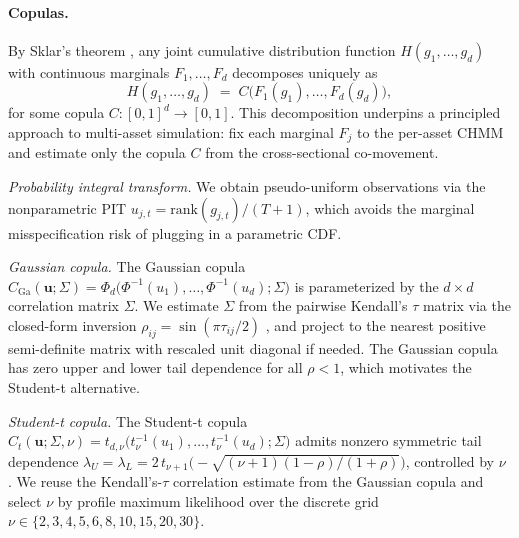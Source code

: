 \paragraph{Copulas.}
By Sklar's theorem \cite{sklar1959fonctions}, any joint cumulative distribution function $H(g_1, \dots, g_d)$ with continuous marginals $F_1, \dots, F_d$ decomposes uniquely as
\begin{equation}
    H(g_1, \dots, g_d) \;=\; C\bigl(F_1(g_1), \dots, F_d(g_d)\bigr),
    \label{eq:sklar}
\end{equation}
for some copula $C : [0,1]^d \to [0,1]$.
This decomposition underpins a principled approach to multi-asset simulation: fix each marginal $F_j$ to the per-asset CHMM and estimate only the copula $C$ from the cross-sectional co-movement.

\textit{Probability integral transform.}
We obtain pseudo-uniform observations via the nonparametric PIT $u_{j,t} = \text{rank}(g_{j,t}) / (T+1)$, which avoids the marginal misspecification risk of plugging in a parametric CDF.

\textit{Gaussian copula.}
The Gaussian copula $C_{\text{Ga}}(\mathbf{u}; \Sigma) = \Phi_d\bigl(\Phi^{-1}(u_1), \dots, \Phi^{-1}(u_d); \Sigma\bigr)$ is parameterized by the $d \times d$ correlation matrix $\Sigma$.
We estimate $\Sigma$ from the pairwise Kendall's $\tau$ matrix via the closed-form inversion $\rho_{ij} = \sin(\pi \tau_{ij} / 2)$ \cite{embrechts2002correlation, mcneil2015quantitative}, and project to the nearest positive semi-definite matrix with rescaled unit diagonal if needed.
The Gaussian copula has zero upper and lower tail dependence for all $\rho < 1$, which motivates the Student-t alternative.

\textit{Student-t copula.}
The Student-t copula $C_t(\mathbf{u}; \Sigma, \nu) = t_{d,\nu}\bigl(t_\nu^{-1}(u_1), \dots, t_\nu^{-1}(u_d); \Sigma\bigr)$ admits nonzero symmetric tail dependence $\lambda_U = \lambda_L = 2\, t_{\nu+1}\!\bigl(-\sqrt{(\nu+1)(1-\rho)/(1+\rho)}\bigr)$, controlled by $\nu$ \cite{demarta2005tcopula}.
We reuse the Kendall's-$\tau$ correlation estimate from the Gaussian copula and select $\nu$ by profile maximum likelihood over the discrete grid $\nu \in \{2, 3, 4, 5, 6, 8, 10, 15, 20, 30\}$.

